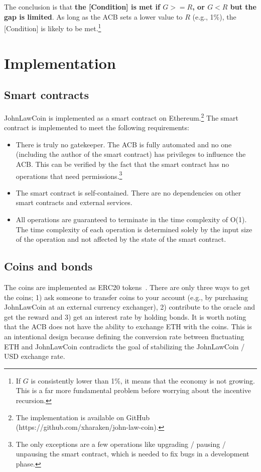 \documentclass[dvipdfmx,a4paper]{article}
\begin{document}
The conclusion is that \textbf{the [Condition] is met if $G>=R$, or $G<R$ but the gap is limited}. As long as the ACB sets a lower value to $R$ (e.g., 1\%), the [Condition] is likely to be met.\footnote{If $G$ is consistently lower than 1\%, it means that the economy is not growing. This is a far more fundamental problem before worrying about the incentive recursion.}

\section{Implementation}

\subsection{Smart contracts}

JohnLawCoin is implemented as a smart contract on Ethereum.\footnote{The implementation is available on GitHub (https://github.com/xharaken/john-law-coin).} The smart contract is implemented to meet the following requirements:

\begin{itemize}
\item There is truly no gatekeeper. The ACB is fully automated and no one (including the author of the smart contract) has privileges to influence the ACB. This can be verified by the fact that the smart contract has no operations that need permissions.\footnote{The only exceptions are a few operations like upgrading / pausing / unpausing the smart contract, which is needed to fix bugs in a development phase.}
\item The smart contract is self-contained. There are no dependencies on other smart contracts and external services.
\item All operations are guaranteed to terminate in the time complexity of O(1). The time complexity of each operation is determined solely by the input size of the operation and not affected by the state of the smart contract.
\end{itemize}

\subsection{Coins and bonds}

The coins are implemented as ERC20 tokens~\cite{erc20token}. There are only three ways to get the coins; 1) ask someone to transfer coins to your account (e.g., by purchasing JohnLawCoin at an external currency exchanger), 2) contribute to the oracle and get the reward and 3) get an interest rate by holding bonds. It is worth noting that the ACB does not have the ability to exchange ETH with the coins. This is an intentional design because defining the conversion rate between fluctuating ETH and JohnLawCoin contradicts the goal of stabilizing the JohnLawCoin / USD exchange rate.
\end{document}
